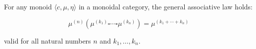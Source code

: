For any monoid $\langle c, \mu, \eta \rangle$ in a monoidal category, the general associative law holds:

$$\mu^{(n)}(\mu^{(k_1)} \square \cdots \square \mu^{(k_n)}) = \mu^{(k_1 + \cdots + k_n)}$$

valid for all natural numbers $n$ and $k_1, \ldots, k_n$.
